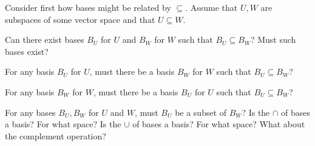 
\begin{Exercise}[
name={},
title={}, 
difficulty=0,
origin={\cite{JH}}]
      \Question Consider first how bases might be related by $\subseteq$.
        Assume that \( U,W \) are subspaces of some vector space and
        that \( U\subseteq W \).
	
	Can there exist bases \( B_U \) for \( U \) and \( B_W \) for \( W \)
        such that \( B_U\subseteq B_W \)?
        Must such bases exist?

        For any basis \( B_U \) for \( U \), must there be a basis \( B_W \)
        for \( W \) such that \( B_U\subseteq B_W \)?

        For any basis \( B_W \) for \( W \), must there be a basis \( B_U \)
        for \( U \) such that \( B_U\subseteq B_W \)?

        For any bases \( B_U, B_W \) for \( U \) and \( W \), must  \( B_U \)
        be a subset of \( B_W \)?
      \Question Is the $\cap$ of bases a basis?
        For what space?
      \Question Is the $\cup$ of bases a basis?
        For what space?
      \Question What about the complement operation?
\end{Exercise}

